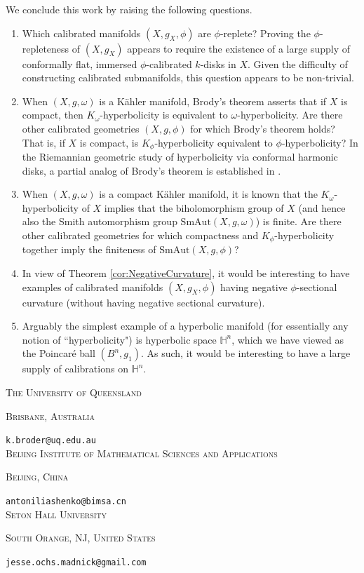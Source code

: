 \documentclass[11pt]{article}
\makeatletter
\theoremstyle{definition}
\numberwithin{equation}{section}
\newcommand{\Addresses}
{{  \bigskip
\noindent	\textsc{The University of Queensland} \par\nopagebreak
\noindent	\textsc{Brisbane, Australia} \par\nopagebreak
\noindent	\texttt{k.broder@uq.edu.au} \\

\medskip
\noindent	\textsc{Beijing Institute of Mathematical Sciences and Applications} \par\nopagebreak
\noindent	\textsc{Beijing, China} \par\nopagebreak
\noindent	\texttt{antoniliashenko@bimsa.cn} \\

\medskip
\noindent	\textsc{Seton Hall University} \par\nopagebreak
\noindent	\textsc{South Orange, NJ, United States} \par\nopagebreak
\noindent	\texttt{jesse.ochs.madnick@gmail.com} \\
}}
\makeatother
\begin{document}
\indent We conclude this work by raising the following questions.
\begin{enumerate}
\item Which calibrated manifolds $(X, g_X, \phi)$ are $\phi$-replete?  Proving the $\phi$-repleteness of $(X, g_X)$ appears to require the existence of a large supply of conformally flat, immersed $\phi$-calibrated $k$-disks in $X$.  Given the difficulty of constructing calibrated submanifolds, this question appears to be non-trivial.
\item When $(X, g, \omega)$ is a K\"{a}hler manifold, Brody's theorem \cite{brody1978compact} asserts that if $X$ is compact, then $K_\omega$-hyperbolicity is equivalent to $\omega$-hyperbolicity.  Are there other calibrated geometries $(X, g, \phi)$ for which Brody's theorem holds?  That is, if $X$ is compact, is $K_\phi$-hyperbolicity equivalent to $\phi$-hyperbolicity?  In the Riemannian geometric study of hyperbolicity via conformal harmonic disks, a partial analog of Brody's theorem is established in \cite[Theorem 6.7]{gaussier2024kobayashi}.
\item When $(X, g, \omega)$ is a compact K\"{a}hler manifold, it is known that the $K_\omega$-hyperbolicity of $X$ implies that the biholomorphism group of $X$ (and hence also the Smith automorphism group $\mathrm{SmAut}(X, g, \omega)$) is finite.  Are there other calibrated geometries for which compactness and $K_\phi$-hyperbolicity together imply the finiteness of $\mathrm{SmAut}(X, g, \phi)$?
\item In view of Theorem \ref{cor:NegativeCurvature}, it would be interesting to have examples of calibrated manifolds $(X, g_X, \phi)$ having negative $\phi$-sectional curvature (without having negative sectional curvature).
\item Arguably the simplest example of a hyperbolic manifold (for essentially any notion of ``hyperbolicity") is hyperbolic space $\mathbb{H}^n$, which we have viewed as the Poincar\'{e} ball $(B^n, g_1)$.  As such, it would be interesting to have a large supply of calibrations on $\mathbb{H}^n$.
\end{enumerate}




\Addresses
\end{document}
